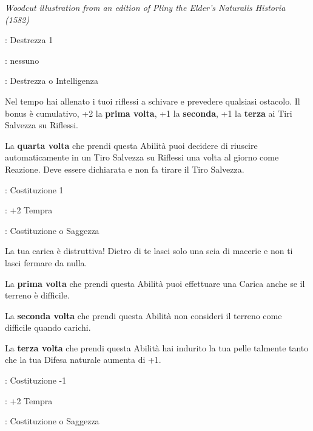 \begin{multicols}{2}
\begin{center}
	\emph{Woodcut illustration from an edition of Pliny the Elder's Naturalis Historia (1582)}
\end{center}

\begin{description}[noitemsep, topsep=0pt, parsep=0pt, partopsep=0pt, leftmargin=0cm, labelwidth=2.5cm]
    \item[\textbf{Requisito}]: Destrezza 1
    \item[\textbf{Tiri Salvezza}]: nessuno
    \item[\textbf{Caratteristica}]: Destrezza o Intelligenza
\end{description}

Nel tempo hai allenato i tuoi riflessi a schivare e prevedere qualsiasi ostacolo. Il bonus è cumulativo, +2 la \textbf{prima volta}, +1 la \textbf{seconda}, +1 la \textbf{terza} ai Tiri Salvezza su Riflessi.

La \textbf{quarta volta} che prendi questa Abilità puoi decidere di riuscire automaticamente in un Tiro Salvezza su Riflessi una volta al giorno come Reazione. Deve essere dichiarata e non fa tirare il Tiro Salvezza.

\begin{description}[noitemsep, topsep=0pt, parsep=0pt, partopsep=0pt, leftmargin=0cm, labelwidth=2.5cm]
    \item[\textbf{Requisito}]: Costituzione 1
    \item[\textbf{Tiri Salvezza}]: +2 Tempra
    \item[\textbf{Caratteristica}]: Costituzione o Saggezza
\end{description}

La tua carica è distruttiva! Dietro di te lasci solo una scia di macerie e non ti lasci fermare da nulla.

La \textbf{prima volta} che prendi questa Abilità puoi effettuare una Carica anche se il terreno è difficile.

La \textbf{seconda volta} che prendi questa Abilità non consideri il terreno come difficile quando carichi.

La \textbf{terza volta} che prendi questa Abilità hai indurito la tua pelle talmente tanto che la tua Difesa naturale aumenta di +1.

\begin{description}[noitemsep, topsep=0pt, parsep=0pt, partopsep=0pt, leftmargin=0cm, labelwidth=2.5cm]
    \item[\textbf{Requisito}]: Costituzione -1
    \item[\textbf{Tiri Salvezza}]: +2 Tempra
    \item[\textbf{Caratteristica}]: Costituzione o Saggezza
\end{description}


\end{multicols}
